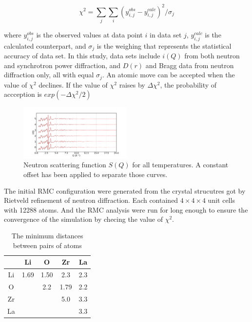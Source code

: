 \documentclass[twoside,twocolumn,9pt]{article}
\begin{document}
\begin{equation}
\chi^2=\sum_{j}\sum_{i}(y^{obs}_{i,j}-y^{calc}_{i,j})^2/\sigma_{j}
\end{equation}

where $y^{obs}_{i,j}$ is the observed values at data point $i$ in data set $j$, $y^{calc}_{i,j}$ is the calculated counterpart, and  $\sigma_{j}$ is the weighing that represents
the statistical accuracy of data set. In this study, data sets include $i(Q)$ from both neutron and  synchrotron power diffraction, and $D(r)$ and Bragg data from neutron diffraction only,
all with equal $\sigma_{j}$. An atomic move can be accepted when the value of $\chi^2$ declines. If the value of $\chi^2$ raises by $\Delta \chi^2$, the probability of accception is $exp(-\Delta \chi^2/2)$

\begin{figure}
\centering
\includegraphics[width=0.5\textwidth]{Pics/nsoq.pdf}
\caption{Neutron scattering function $S(Q)$ for all temperatures. A constant offset has been applied to separate those curves.}
\label{fig:nsoq}
\end{figure}

The initial RMC configuration were generated from the crystal strucutres got by Rietveld refinement of neutron diffraction.
Each contained $4\times 4\times 4$ unit cells with 12288 atoms. And the RMC analysis were run for long enough to ensure the convergence of the simulation by checing the value of $\chi^2$.



\begin{table}[h]
\centering
\caption{The minimum distances between pairs of atoms} \label{tab:min_dis}
\begin{tabular}{c|cccc}
\hline
   & Li & O & Zr & La \\
\hline
Li & 1.69 & 1.50 & 2.3 & 2.3 \\
O  &      & 2.2  & 1.79& 2.2 \\
Zr &      &      & 5.0 & 3.3 \\
La &      &      &     & 3.3 \\
\hline
\end{tabular}
\end{table}
\end{document}

